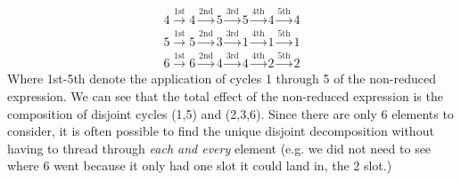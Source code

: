 \begin{example}
\begin{align}
    4 \overset{\text{1st}}{\rightarrow} 4 \overset{\text{2nd}}{\rightarrow} 5 \overset{\text{3rd}}{\rightarrow}5 \overset{\text{4th}}{\rightarrow}4 \overset{\text{5th}}{\rightarrow}4 \nonumber \\
    5 \overset{\text{1st}}{\rightarrow} 5 \overset{\text{2nd}}{\rightarrow} 3 \overset{\text{3rd}}{\rightarrow}1 \overset{\text{4th}}{\rightarrow}1 \overset{\text{5th}}{\rightarrow}1 \nonumber \\
    6 \overset{\text{1st}}{\rightarrow} 6 \overset{\text{2nd}}{\rightarrow} 4 \overset{\text{3rd}}{\rightarrow}4 \overset{\text{4th}}{\rightarrow}2 \overset{\text{5th}}{\rightarrow}2 \nonumber
\end{align}
Where 1st-5th denote the application of cycles 1 through 5 of the non-reduced expression. We can see
that the total effect of the non-reduced expression is the composition of disjoint cycles (1,5) and
(2,3,6). Since there are only 6 elements to consider, it is often possible to find the unique
disjoint decomposition without having to thread through \textit{each and every} element (e.g. we did
not need to see where 6 went because it only had one slot it could land in, the 2 slot.)
\end{example}

